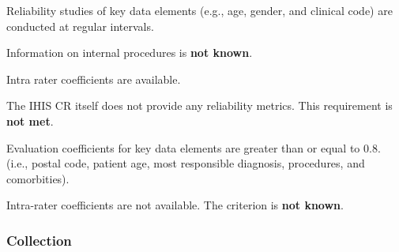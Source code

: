 \begin{QandA}
    \item Reliability studies of key data elements (e.g., age, gender, and clinical code) are conducted at regular intervals.
    \begin{answered}
        Information on internal procedures is \textbf{not known}.
    \end{answered}

    \item Intra rater coefficients are available.
    \begin{answered}
        The IHIS CR itself does not provide any reliability metrics.
        This requirement is \textbf{not met}.
    \end{answered}

    \item Evaluation coefficients for key data elements are greater than or equal to 0.8. (i.e., postal code, patient age, most responsible diagnosis, procedures, and comorbities).
    \begin{answered}
        Intra-rater coefficients are not available.
        The criterion is \textbf{not known}.
    \end{answered}

\end{QandA}

\subsubsection{Collection}

